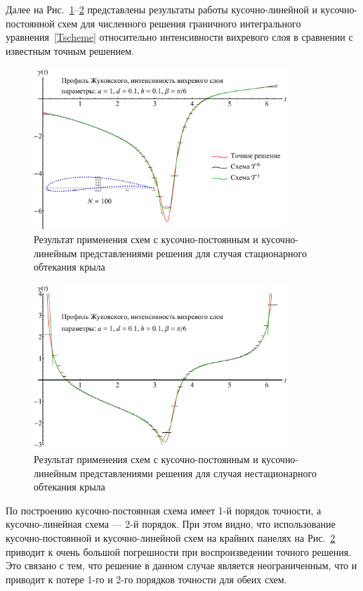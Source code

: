 \documentclass[12pt, a4paper]{article}
\begin{document}
Далее на Рис.~\ref{wing100boundSol_toYuliya}--\ref{wing100unboundSol_toYuliya} представлены результаты работы кусочно-линейной и кусочно-постоянной схем для численного решения граничного интегрального уравнения~\eqref{Tscheme} относительно интенсивности вихревого слоя в сравнении с известным точным решением.

\begin{figure}[!h]
	\center\includegraphics[width=0.85\textwidth]{wing100boundSol_toYuliya}
	\caption{Результат применения схем с кусочно-постоянным и кусочно-линейным представлениями решения для случая стационарного обтекания крыла}\label{wing100boundSol_toYuliya}
\end{figure}

\begin{figure}[!h]
	\center\includegraphics[width=0.85\textwidth]{wing100unboundSol_toYuliya}
	\caption{Результат применения схем с кусочно-постоянным и кусочно-линейным представлениями решения для случая нестационарного обтекания крыла}\label{wing100unboundSol_toYuliya}
\end{figure}\medskip

По построению кусочно-постоянная схема имеет 1-й порядок точности, а кусочно-линейная схема --- 2-й порядок. При этом видно, что использование кусочно-постоянной и кусочно-линейной схем на крайних панелях на Рис.~\ref{wing100unboundSol_toYuliya} приводит к очень большой погрешности при воспроизведении точного решения. Это связано с тем, что решение в данном случае является неограниченным, что и приводит к потере 1-го и 2-го порядков точности для обеих схем. 
\end{document}
